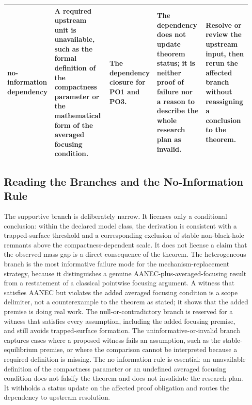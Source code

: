 \documentclass[conference]{IEEEtran}
\begin{document}
\begin{table}[htbp]
\begin{tabular}{|p{}|p{}|p{}|p{}|p{}|}
no-information dependency & A required upstream unit is unavailable, such as the formal definition of the compactness parameter or the mathematical form of the averaged focusing condition. & The dependency closure for PO1 and PO3. & The dependency does not update theorem status; it is neither proof of failure nor a reason to describe the whole research plan as invalid. & Resolve or review the upstream input, then rerun the affected branch without reassigning a conclusion to the theorem. \\\hline
\end{tabular}
\end{table}

\subsection{Reading the Branches and the No-Information Rule}
The supportive branch is deliberately narrow. It licenses only a conditional conclusion: within the declared model class, the derivation is consistent with a trapped-surface threshold and a corresponding exclusion of stable non-black-hole remnants above the compactness-dependent scale. It does not license a claim that the observed mass gap is a direct consequence of the theorem. The heterogeneous branch is the most informative failure mode for the mechanism-replacement strategy, because it distinguishes a genuine AANEC-plus-averaged-focusing result from a restatement of a classical pointwise focusing argument. A witness that satisfies AANEC but violates the added averaged focusing condition is a scope delimiter, not a counterexample to the theorem as stated; it shows that the added premise is doing real work. The null-or-contradictory branch is reserved for a witness that satisfies every assumption, including the added focusing premise, and still avoids trapped-surface formation. The uninformative-or-invalid branch captures cases where a proposed witness fails an assumption, such as the stable-equilibrium premise, or where the comparison cannot be interpreted because a required definition is missing. The no-information rule is essential: an unavailable definition of the compactness parameter or an undefined averaged focusing condition does not falsify the theorem and does not invalidate the research plan. It withholds a status update on the affected proof obligation and routes the dependency to upstream resolution.
\end{document}
